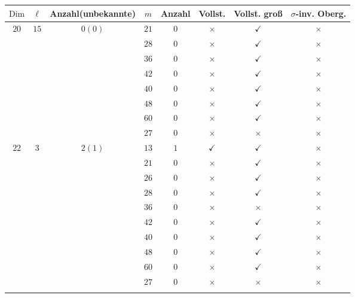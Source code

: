 \documentclass[12pt,a4paper,halfparskip,headsepline,bibtotocnumbered]{scrreprt}
\theoremstyle{nummermitklammern}
\theoremstyle{nonumberbreak}
\newcommand{\Dim}{\text{Dim}}
\begin{document}
\begin{table}[H]
	\centering
	\begin{tabular}{|c|c|c|c|c|c|c|c|}
		\hline		
		$\Dim$					&$\ell$					&{Anzahl(unbekannte)}		&$m$	&Anzahl	&Vollst.	&Vollst. groß	&$\sigma$-inv. Oberg.\\ \hline
		\multirow{8}{*}{$20$}	&\multirow{8}{*}{$15$}	&\multirow{8}{*}{$0(0)$}	&$21$	&$0$	&$\times$		&$\checkmark$	&$\times$\\ \cline{4-8}
								&						&							&$28$	&$0$	&$\times$		&$\checkmark$	&$\times$\\ \cline{4-8}
								&						&							&$36$	&$0$	&$\times$		&$\checkmark$	&$\times$\\ \cline{4-8}
								&						&							&$42$	&$0$	&$\times$		&$\checkmark$	&$\times$\\ \cline{4-8}
								&						&							&$40$	&$0$	&$\times$		&$\checkmark$	&$\times$\\ \cline{4-8}
								&						&							&$48$	&$0$	&$\times$		&$\checkmark$	&$\times$\\ \cline{4-8}
								&						&							&$60$	&$0$	&$\times$		&$\checkmark$	&$\times$\\ \cline{4-8}
								&						&							&$27$	&$0$	&$\times$		&$\times$		&$\times$\\ \hline
		\multirow{20}{*}{$22$}	&\multirow{13}{*}{$3$}	&\multirow{13}{*}{$2(1)$}	&$13$	&$1$	&$\checkmark$	&$\checkmark$	&$\times$\\ \cline{4-8}
								&						&							&$21$	&$0$	&$\times$		&$\checkmark$	&$\times$\\ \cline{4-8}
								&						&							&$26$	&$0$	&$\times$		&$\checkmark$	&$\times$\\ \cline{4-8}
								&						&							&$28$	&$0$	&$\times$		&$\checkmark$	&$\times$\\ \cline{4-8}
								&						&							&$36$	&$0$	&$\times$		&$\times$		&$\times$\\ \cline{4-8}
								&						&							&$42$	&$0$	&$\times$		&$\checkmark$	&$\times$\\ \cline{4-8}
								&						&							&$40$	&$0$	&$\times$		&$\checkmark$	&$\times$\\ \cline{4-8}
								&						&							&$48$	&$0$	&$\times$		&$\checkmark$	&$\times$\\ \cline{4-8}
								&						&							&$60$	&$0$	&$\times$		&$\checkmark$	&$\times$\\ \cline{4-8}
								&						&							&$27$	&$0$	&$\times$		&$\times$		&$\times$\\ \cline{4-8}

\end{tabular}
\end{table}
\end{document}
